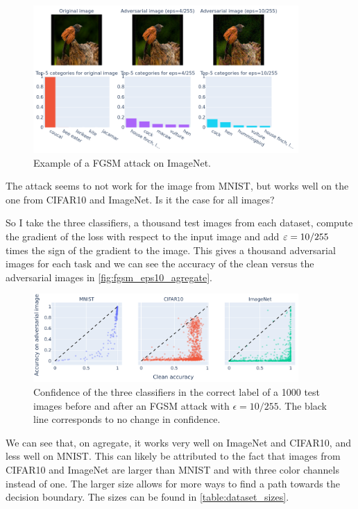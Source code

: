 \documentclass[]{scrarticle}
\begin{document}
\begin{figure}[H]
  \centering
  \includegraphics[width=0.9\textwidth]{images/fgsm_example_ImageNet.png}
  \caption{Example of a FGSM attack on ImageNet.}
  \label{fig:fgsm_examples_imagenet}
\end{figure}

The attack seems to not work for the image from MNIST, but works well
on the one from CIFAR10 and ImageNet.
Is it the case for all images?

So I take the three classifiers, a thousand test images from each dataset,
compute the gradient of the loss with respect to the input image
and add $\varepsilon = 10 / 255$ times the sign of the gradient to the image.
This gives a thousand adversarial images for each task and
we can see the accuracy of the clean versus the adversarial images
in \autoref{fig:fgsm_eps10_agregate}.

\begin{figure}[H]
  \centering
  \includegraphics[width=0.9\textwidth]{images/fgsm_strength.png}
  \caption{Confidence of the three classifiers in the correct label of
    a 1000 test images before and after an FGSM attack with $\epsilon = 10 / 255$.
    The black line corresponds to no change in confidence.
  }
  \label{fig:fgsm_eps10_agregate}
\end{figure}

We can see that, on agregate, it works very well on ImageNet and CIFAR10,
and less well on MNIST. This can likely be attributed to the fact that
images from CIFAR10 and ImageNet are larger than MNIST and with three
color channels instead of one. The larger size allows for more ways to
find a path towards the decision boundary.
The sizes can be found in \autoref{table:dataset_sizes}.
\end{document}
